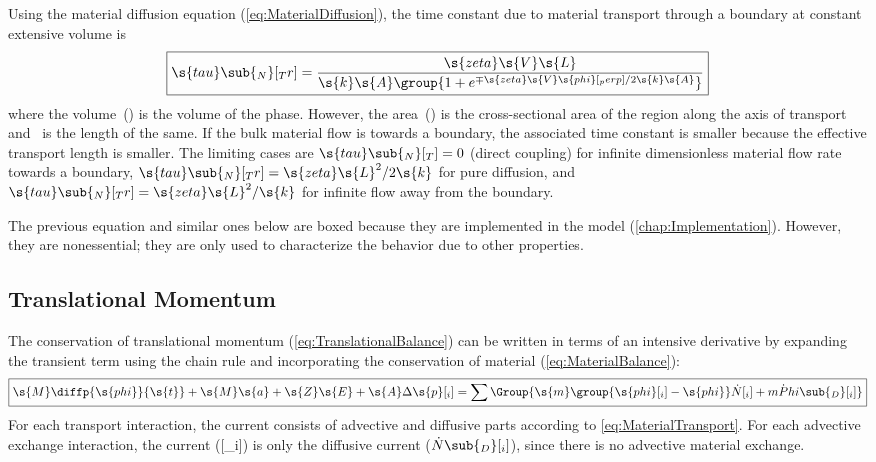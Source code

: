 Using the material diffusion equation (\ref{eq:MaterialDiffusion}), the time constant due to material transport through a boundary at constant extensive volume is
\begin{equation}
  \boxed{\s{tau}\sub{_N}[_Tr] = \frac{\s{zeta}\s{V}\s{L}}{\s{k}\s{A}\group{1 + e^{\mp\s{zeta}\s{V}\s{phi}[_perp]/2\s{k}\s{A}}}}}
\end{equation}
where the volume~() is the volume of the phase.  However, the area~() is the cross-sectional area of the region along the axis of transport and ~is the length of the same.  If the bulk material flow is towards a boundary, the associated time constant is smaller because the effective transport length is smaller.  The limiting cases are $\s{tau}\sub{_N}[_T] = 0$ (direct coupling) for infinite dimensionless material flow rate towards a boundary, $\s{tau}\sub{_N}[_Tr] = \s{zeta}\s{L}^2/2\s{k}$ for pure diffusion, and $\s{tau}\sub{_N}[_Tr] = \s{zeta}\s{L}^2/\s{k}$ for infinite flow away from the boundary.


The previous equation and similar ones below are boxed because they are implemented in the model (\autoref{chap:Implementation}).  However, they are nonessential;  they are only used to characterize the behavior due to other properties.



\subsection{Translational Momentum}
\label{sec:TranslationalBalance}

The conservation of translational momentum (\autoref{eq:TranslationalBalance}) can be written in terms of an intensive derivative by expanding the transient term using the chain rule and incorporating the conservation of material (\autoref{eq:MaterialBalance}):
\begin{equation}
  \label{eq:TranslationalBalanceIntensive}
  \boxed{\s{M}\diffp{\s{phi}}{\s{t}} + \s{M}\s{a} + \s{Z}\s{E} + \s{A}\Delta\s{p}[_i] = \sum\Group{\s{m}\group{\s{phi}[_i] - \s{phi}}\dot{N}[_i] + \dot{mPhi}\sub{_D}[_i]}}
\end{equation}
For each transport interaction, the current consists of advective and diffusive parts according to \autoref{eq:MaterialTransport}.  For each advective exchange interaction, the current ([_i]) is only the diffusive current ($\dot{N}\sub{_D}[_i]$), since there is no advective material exchange.

